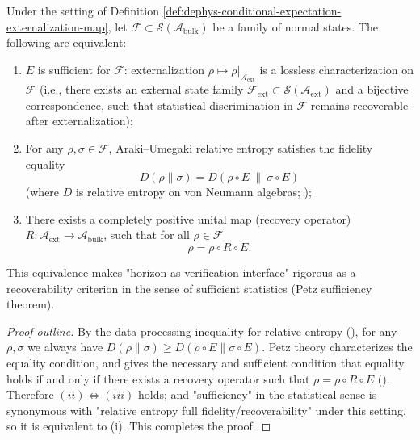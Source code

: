 \begin{theorem}\label{thm:dephys-petz-sufficiency-equivalences}
Under the setting of Definition \ref{def:dephys-conditional-expectation-externalization-map},
let \(\mathcal{F}\subset\mathcal{S}(\mathcal{A}_{\mathrm{bulk}})\) be a family of normal states.
The following are equivalent:
\begin{enumerate}
  \item[(i)] \(E\) is sufficient for \(\mathcal{F}\): externalization \(\rho\mapsto \rho|_{\mathcal{A}_{\mathrm{ext}}}\) is a lossless characterization on \(\mathcal{F}\) (i.e., there exists an external state family \(\mathcal{F}_{\mathrm{ext}}\subset\mathcal{S}(\mathcal{A}_{\mathrm{ext}})\) and a bijective correspondence, such that statistical discrimination in \(\mathcal{F}\) remains recoverable after externalization);
  \item[(ii)] For any \(\rho,\sigma\in\mathcal{F}\), Araki--Umegaki relative entropy satisfies the fidelity equality
  \begin{equation}\label{eq:dephys-relative-entropy-sufficiency-equality}
  \boxed{\;
  D(\rho\|\sigma)=D(\rho\circ E\ \|\ \sigma\circ E)\;}
  \end{equation}
  (where \(D\) is relative entropy on von Neumann algebras; \cite{Araki1976RelativeEntropyVonNeumann});
  \item[(iii)] There exists a completely positive unital map (recovery operator) \(R:\mathcal{A}_{\mathrm{ext}}\to\mathcal{A}_{\mathrm{bulk}}\), such that for all \(\rho\in\mathcal{F}\)
  \begin{equation}\label{eq:dephys-recovery-map-identity-on-family}
  \boxed{\;
  \rho=\rho\circ R\circ E.\;}
  \end{equation}
\end{enumerate}
This equivalence makes "horizon as verification interface" rigorous as a recoverability criterion in the sense of sufficient statistics (Petz sufficiency theorem).
\end{theorem}

\begin{proof}[Proof outline]
By the data processing inequality for relative entropy (\cite{Petz2003MonotonicityRelativeEntropyRevisited}), for any \(\rho,\sigma\) we always have
\(
D(\rho\|\sigma)\ge D(\rho\circ E\|\sigma\circ E)
\).
Petz theory characterizes the equality condition, and gives the necessary and sufficient condition that equality holds if and only if there exists a recovery operator such that \(\rho=\rho\circ R\circ E\) (\cite{Petz1986SufficientSubalgebrasRelativeEntropy}).
Therefore \((ii)\Longleftrightarrow(iii)\) holds; and "sufficiency" in the statistical sense is synonymous with "relative entropy full fidelity/recoverability" under this setting, so it is equivalent to (i). This completes the proof.
\end{proof}

